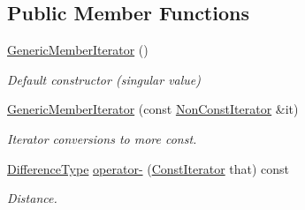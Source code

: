 \subsection*{Public Member Functions}
\begin{DoxyCompactItemize}
\item 
\hyperlink{class_generic_member_iterator_a2708717d497a0aadacdf75900de4c5b4}{Generic\+Member\+Iterator} ()
\begin{DoxyCompactList}\small\item\em Default constructor (singular value) \end{DoxyCompactList}\item 
\hyperlink{class_generic_member_iterator_a2697fd327a90654b0bf91c988e43f95e}{Generic\+Member\+Iterator} (const \hyperlink{class_generic_member_iterator_abc26eb06f2962765b11dcd06ce84ac02}{Non\+Const\+Iterator} \&it)
\begin{DoxyCompactList}\small\item\em Iterator conversions to more const. \end{DoxyCompactList}\item 
\hyperlink{class_generic_member_iterator_a902b99c8ae351cd7626514dc5f30740a}{Difference\+Type} \hyperlink{class_generic_member_iterator_a056851821e75c4be13b297604bc37c0b}{operator-\/} (\hyperlink{class_generic_member_iterator_ae5be27a73dce0be58ee2776db896d591}{Const\+Iterator} that) const \hypertarget{class_generic_member_iterator_a056851821e75c4be13b297604bc37c0b}{}\label{class_generic_member_iterator_a056851821e75c4be13b297604bc37c0b}

\begin{DoxyCompactList}\small\item\em Distance. \end{DoxyCompactList}\end{DoxyCompactItemize}
